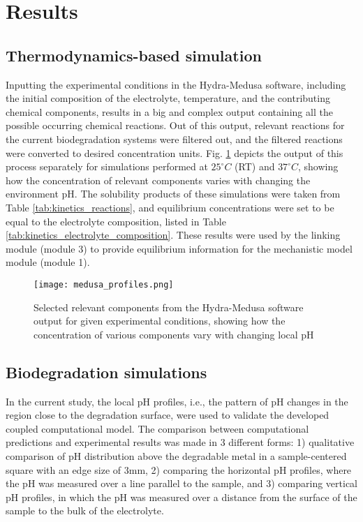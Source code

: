 \section{Results}

\subsection{Thermodynamics-based simulation}

Inputting the experimental conditions in the Hydra-Medusa software, including the initial composition of the electrolyte, temperature, and the contributing chemical components, results in a big and complex output containing all the possible occurring chemical reactions. Out of this output, relevant reactions for the current biodegradation systems were filtered out, and the filtered reactions were converted to desired concentration units. Fig. \ref{fig:kinetics_medusa_profiles} depicts the output of this process separately for simulations performed at $25^{\circ}C$ (\gls{RT}) and $37^{\circ}C$, showing how the concentration of relevant components varies with changing the environment pH. The solubility products of these simulations were taken from Table \ref{tab:kinetics_reactions}, and equilibrium concentrations were set to be equal to the electrolyte composition, listed in Table  \ref{tab:kinetics_electrolyte_composition}. These results were used by the linking module (module 3) to provide equilibrium information for the mechanistic model module (module 1).

\begin{figure}[h]
\centering
\medskip
\texttt{[image: medusa\_profiles.png]}
\caption[Hydra-Medusa software output for given experimental conditions]{Selected relevant components from the Hydra-Medusa software output for given experimental conditions, showing how the concentration of various components vary with changing local pH} \label{fig:kinetics_medusa_profiles}
\end{figure}

\subsection{Biodegradation simulations}

In the current study, the local pH profiles, i.e., the pattern of pH changes in the region close to the degradation surface, were used to validate the developed coupled computational model. The comparison between computational predictions and experimental results was made in 3 different forms: 1) qualitative comparison of pH distribution above the degradable metal in a sample-centered square with an edge size of $3 \text{mm}$, 2) comparing the horizontal pH profiles, where the pH was measured over a line parallel to the sample, and 3) comparing vertical pH profiles, in which the pH was measured over a distance from the surface of the sample to the bulk of the electrolyte.


